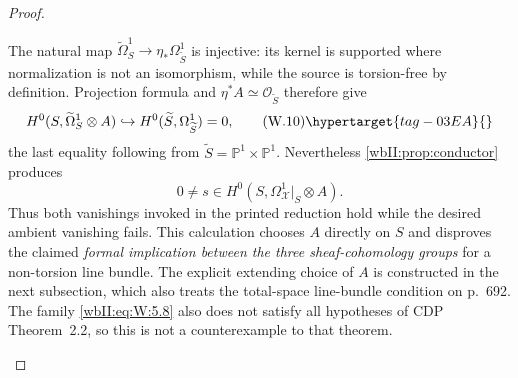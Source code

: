 \begin{proof}
\begin{enumerate}[label={$\langle1\rangle$\arabic*.},leftmargin=*]
The natural map
$\widetilde\Omega^1_S\to\eta_*\Omega^1_{\widetilde S}$ is injective:
its kernel is supported where normalization is not an isomorphism, while
the source is torsion-free by definition.  Projection formula and
$\eta^*A\simeq\mathcal O_{\widetilde S}$ therefore give
\[
H^0(S,\widetilde\Omega^1_S\otimes A)
\hookrightarrow
H^0(\widetilde S,\Omega^1_{\widetilde S})=0,
\tag{W.10}\hypertarget{tag-03EA}{}\label{wbII:eq:W:5.10}
\]
the last equality following from
$\widetilde S=\mathbb P^1\times\mathbb P^1$.
Nevertheless \cref{wbII:prop:conductor} produces
\[
0\ne s\in H^0(S,\Omega^1_{\mathcal X}|_S\otimes A).
\]
Thus both vanishings invoked in the printed reduction hold while the desired
ambient vanishing fails.  This calculation chooses $A$ directly on $S$ and disproves the
claimed \emph{formal implication between the three sheaf-cohomology groups}
for a non-torsion line bundle. The explicit extending choice of $A$ is
constructed in the next subsection, which also treats the total-space
line-bundle condition on p.~692.  The family \eqref{wbII:eq:W:5.8} also does not satisfy all hypotheses of CDP
Theorem~2.2, so this is not a counterexample to that theorem.

\end{enumerate}
\end{proof}

